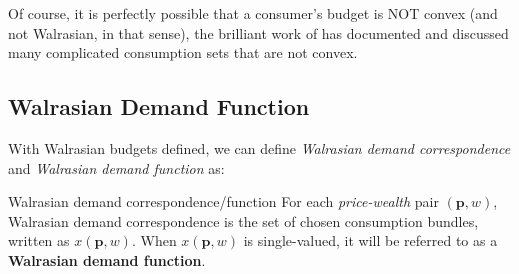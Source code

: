 Of course, it is perfectly possible that a consumer's budget is NOT convex (and not Walrasian, in that sense), the brilliant work of \citet{deaton1980economics} has documented and discussed many complicated consumption sets that are not convex.

\subsection{Walrasian Demand Function}
With Walrasian budgets defined, we can define \textit{Walrasian demand correspondence} and \textit{Walrasian demand function} as:
\begin{definition}{Walrasian demand correspondence/function}{}
    For each \textit{price-wealth} pair $(\mathbf{p},w)$, Walrasian demand correspondence is the set of chosen consumption bundles, written as $ x(\mathbf{p},w)$. When $ x(\mathbf{p},w)$ is single-valued, it will be referred to as a \textbf{Walrasian demand function}.
\end{definition}

